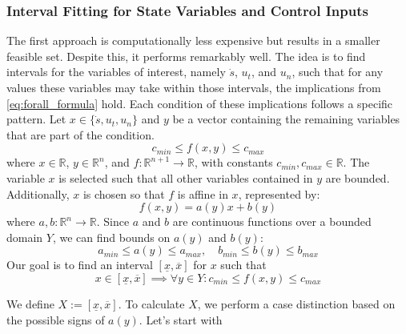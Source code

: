 \subsubsection{Interval Fitting for State Variables and Control Inputs}

The first approach is computationally less expensive but results in a smaller feasible set.
Despite this, it performs remarkably well.
The idea is to find intervals for the variables of interest, namely $\dot{s}$, $u_t$, and $u_n$, such that for any values these variables may take
within those intervals, the implications from \eqref{eq:forall_formula} hold.
Each condition of these implications follows a specific pattern.
Let $x \in \{\dot{s}, u_t, u_n\}$ and $y$ be a vector containing the remaining variables that are part of the condition.
\begin{equation}
	\label{eq:cur_condition}
	c_{min} \leq f(x, y) \leq c_{max}
\end{equation}
where $x \in \mathbb{R}$, $y \in \mathbb{R}^n$, and $f: \mathbb{R}^{n+1} \to \mathbb{R}$, with constants $c_{min}, c_{max} \in \mathbb{R}$.
The variable $x$ is selected such that all other variables contained in $y$ are bounded.
Additionally, $x$ is chosen so that $f$ is affine in $x$, represented by:
\begin{equation}
	f(x, y) = a(y) x + b(y)
\end{equation}
where $a, b : \mathbb{R}^n \to \mathbb{R}$. Since $a$ and $b$ are continuous functions over a bounded domain $Y$, we can find bounds on $a(y)$ and $b(y)$:
\begin{equation}
	a_{min} \leq a(y) \leq a_{max}, \quad b_{min} \leq b(y) \leq b_{max}
\end{equation}
Our goal is to find an interval $[\underline{x}, \overline{x}]$ for $x$ such that
\begin{equation}
	x\in [\underline{x}, \overline{x}] \implies \forall y\in Y: c_{min} \leq f(x, y) \leq c_{max}
\end{equation}

We define $X := [\underline{x}, \overline{x}]$.
To calculate $X$, we perform a case distinction based on the possible signs of $a(y)$.
Let's start with

